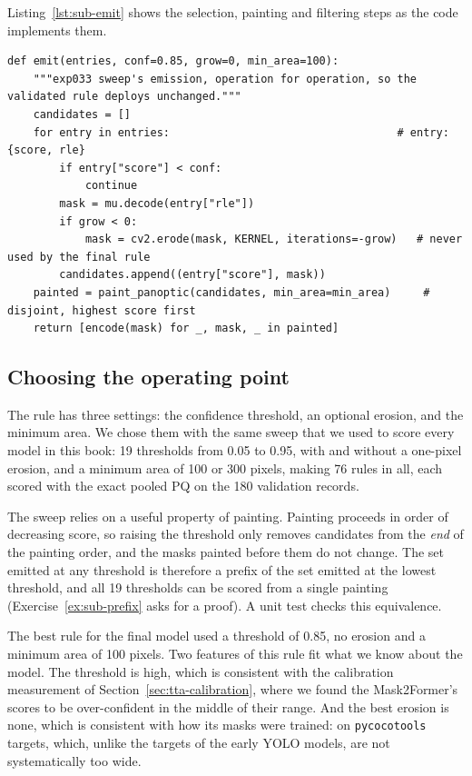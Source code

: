 Listing~\ref{lst:sub-emit} shows the selection, painting and filtering steps as the code implements
them.

\begin{lstlisting}[caption={The emission rule, shared by validation and deployment. Condensed from
\file{experiments/exp\_139\_mask2former/src/submit.py:emit}.},label=lst:sub-emit]
def emit(entries, conf=0.85, grow=0, min_area=100):
    """exp033 sweep's emission, operation for operation, so the validated rule deploys unchanged."""
    candidates = []
    for entry in entries:                                   # entry: {score, rle}
        if entry["score"] < conf:
            continue
        mask = mu.decode(entry["rle"])
        if grow < 0:
            mask = cv2.erode(mask, KERNEL, iterations=-grow)   # never used by the final rule
        candidates.append((entry["score"], mask))
    painted = paint_panoptic(candidates, min_area=min_area)     # disjoint, highest score first
    return [encode(mask) for _, mask, _ in painted]
\end{lstlisting}

\subsection{Choosing the operating point}\label{sec:sub-operating}
The rule has three settings: the confidence threshold, an optional erosion, and the minimum area. We
chose them with the same sweep that we used to score every model in this book: 19 thresholds from 0.05
to 0.95, with and without a one-pixel erosion, and a minimum area of 100 or 300 pixels, making 76 rules
in all, each scored with the exact pooled PQ on the 180 validation records.

The sweep relies on a useful property of painting. Painting proceeds in order of decreasing score,
so raising the threshold only removes candidates from the \emph{end} of the painting order, and the
masks painted before them do not change. The set emitted at any threshold is therefore a prefix of the
set emitted at the lowest threshold, and all 19 thresholds can be scored from a single painting
(Exercise~\ref{ex:sub-prefix} asks for a proof). A unit test checks this equivalence.

The best rule for the final model used a threshold of 0.85, no erosion and a minimum area of 100
pixels. Two features of this rule fit what we know about the model. The threshold is high, which is
consistent with the calibration measurement of Section~\ref{sec:tta-calibration}, where we found the
Mask2Former's scores to be over-confident in the middle of their range. And the best erosion is none,
which is consistent with how its masks were trained: on \texttt{pycocotools} targets, which, unlike
the targets of the early YOLO models, are not systematically too wide.

